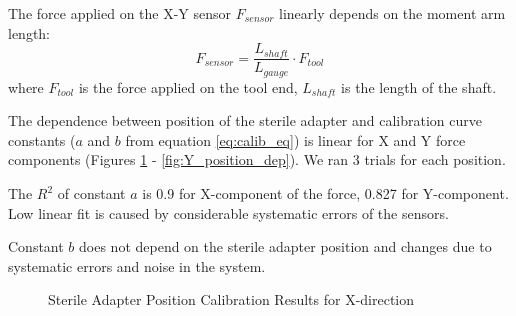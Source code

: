 	The force applied on the X-Y sensor $F_{sensor}$ linearly depends on the moment arm length:
	\begin{equation}
	F_{sensor} = \frac{L_{shaft}}{L_{gauge}} \cdot F_{tool}
	\end{equation}
	where $F_{tool}$ is the force applied on the tool end, $L_{shaft}$ is the length of the shaft.

The dependence between position of the sterile adapter and calibration curve constants ($a$ and $b$ from equation \ref{eq:calib_eq}) is linear for X and Y force components (Figures \ref{fig:X_position_dep} - \ref{fig:Y_position_dep}). We ran 3 trials for each position.

The $R^2$ of constant $a$ is 0.9 for X-component of the force, 0.827 for Y-component. Low linear fit is caused by considerable systematic errors of the sensors.

Constant $b$ does not depend on the sterile adapter position and changes due to systematic errors and noise in the system.

	
\begin{figure}[h]%
\centering
{}%
\qquad
{}%
\caption{Sterile Adapter Position Calibration Results for X-direction}
\label{fig:X_position_dep}%
\end{figure}

